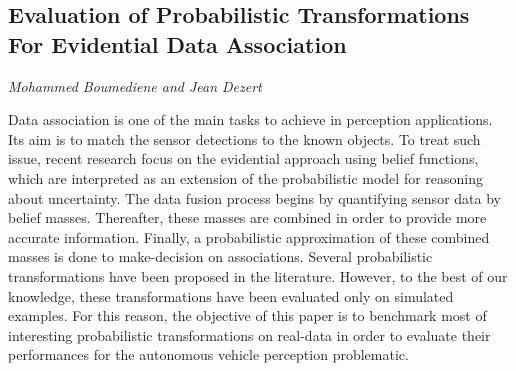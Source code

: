 \documentclass[../booklet.tex]{subfiles}
\begin{document}
\subsection[Evaluation of Probabilistic Transformations For Evidential Data Association. {\it Mohammed Boumediene and Jean Dezert}]{Evaluation of Probabilistic Transformations For Evidential Data Association}
 

\begin{center}
  {\it Mohammed Boumediene and Jean Dezert}
\end{center}



Data association is one of the main tasks to achieve in perception applications. Its aim is to match the sensor detections to the known objects. To treat such issue, recent research focus on the evidential approach using belief functions, which are interpreted as an extension of the probabilistic model for reasoning about uncertainty. The data fusion process begins by quantifying sensor data by belief masses. Thereafter, these masses are combined in order to provide more accurate information. Finally, a probabilistic approximation of these combined masses is done to make-decision on associations. Several probabilistic transformations have been proposed in the literature. However, to the best of our knowledge, these transformations have been evaluated only on simulated examples. For this reason, the objective of this paper is to benchmark most of interesting probabilistic transformations on real-data in order to evaluate their performances for the autonomous vehicle perception problematic. 
\end{document}
